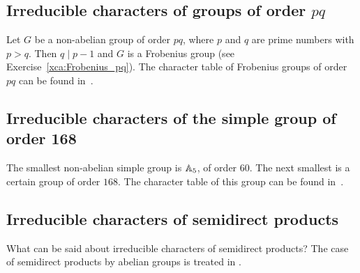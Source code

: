 


\subsection*{Irreducible characters of groups of order $pq$}

Let $G$ be a non-abelian 
group of order $pq$, where 
$p$ and $q$ are prime numbers with $p>q$. Then 
$q\mid p-1$ and $G$ is a Frobenius group (see
Exercise~\ref{xca:Frobenius_pq}). 
The character table of Frobenius groups of order $pq$ can be found in~\cite[Chapter 25]{MR1864147}.

\subsection*{Irreducible characters of the simple group of order 168}

The smallest non-abelian simple group is $\mathbb{A}_5$, of
order $60$. The next smallest
is a certain group of order $168$. The character
table of this group can be found in~\cite[Chapter 27]{MR1864147}. 

\subsection*{Irreducible characters of semidirect products}

What can be said about irreducible characters
of semidirect products? The case of 
semidirect products by abelian groups is treated 
in \cite[Section 8.2]{MR0450380}.



